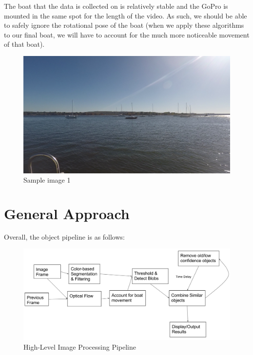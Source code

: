 \documentclass{article}
\begin{document}
The boat that the data is collected on is relatively stable
and the GoPro is mounted in the same spot for the length
of the video. As such, we should be able to safely ignore
the rotational pose of the boat (when we apply these
algorithms to our final boat, we will have to account for
the much more noticeable movement of that boat).
\begin{figure}[H]
\includegraphics[width=12cm]{sample2}
\centering
\caption{Sample image 1}
\end{figure}


\section{General Approach}

Overall, the object pipeline is as follows:
\begin{figure}[H]
\includegraphics[width=16cm]{algorithm_flowchart}
\centering
\caption{High-Level Image Processing Pipeline}
\end{figure}
\end{document}
